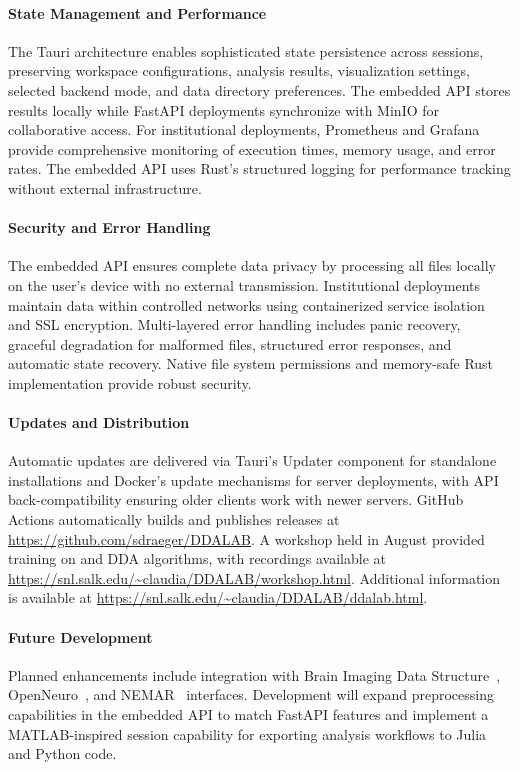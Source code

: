 \paragraph{State Management and Performance}
The Tauri architecture enables sophisticated state persistence across sessions, preserving workspace configurations, analysis results, visualization settings, selected backend mode, and data directory preferences. The embedded API stores results locally while FastAPI deployments synchronize with MinIO for collaborative access. For institutional deployments, Prometheus and Grafana provide comprehensive monitoring of execution times, memory usage, and error rates. The embedded API uses Rust's structured logging for performance tracking without external infrastructure.

\paragraph{Security and Error Handling}
The embedded API ensures complete data privacy by processing all files locally on the user's device with no external transmission. Institutional deployments maintain data within controlled networks using containerized service isolation and SSL encryption. Multi-layered error handling includes panic recovery, graceful degradation for malformed files, structured error responses, and automatic state recovery. Native file system permissions and memory-safe Rust implementation provide robust security.

\paragraph{Updates and Distribution}
Automatic updates are delivered via Tauri's Updater component for standalone installations and Docker's update mechanisms for server deployments, with API back-compatibility ensuring older clients work with newer servers. GitHub Actions automatically builds and publishes releases at \url{https://github.com/sdraeger/DDALAB}. A workshop held in August provided training on {\DDALAB} and DDA algorithms, with recordings available at \url{https://snl.salk.edu/~claudia/DDALAB/workshop.html}. Additional information is available at \url{https://snl.salk.edu/~claudia/DDALAB/ddalab.html}.

\paragraph{Future Development}
Planned enhancements include integration with Brain Imaging Data Structure~\cite{gorgolewski2016brain}, OpenNeuro~\cite{markiewicz2021openneuro}, and NEMAR~\cite{delorme2022nemar} interfaces. Development will expand preprocessing capabilities in the embedded API to match FastAPI features and implement a MATLAB-inspired session capability for exporting analysis workflows to Julia and Python code.
